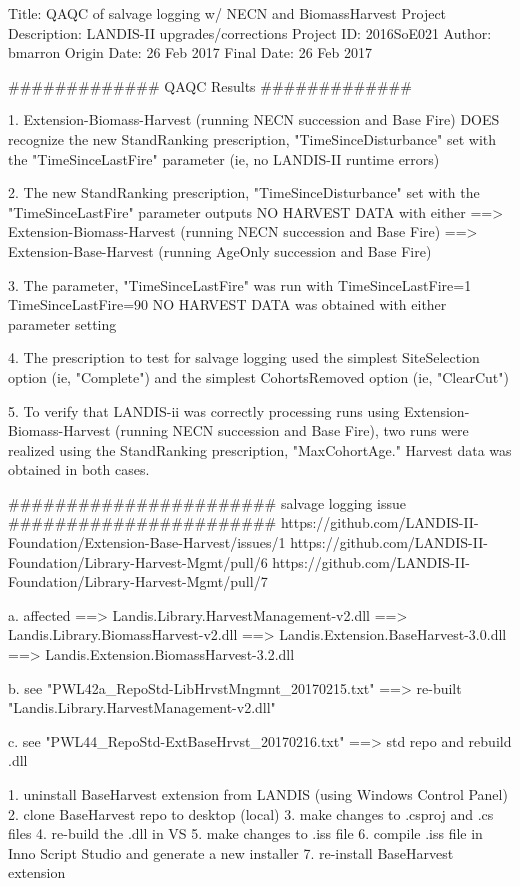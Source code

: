 Title:				QAQC of salvage logging w/ NECN and BiomassHarvest
Project Description:		LANDIS-II upgrades/corrections
Project ID:			2016SoE021
Author:				bmarron
Origin Date:			26 Feb 2017
Final Date:			26 Feb 2017


#############
QAQC Results
#############

	1. Extension-Biomass-Harvest (running NECN succession and Base Fire) DOES recognize 
	    the new StandRanking prescription, "TimeSinceDisturbance" set with the 
	    "TimeSinceLastFire" parameter (ie, no LANDIS-II runtime errors)

	2. The new StandRanking prescription, "TimeSinceDisturbance" set with the 
	   "TimeSinceLastFire" parameter outputs NO HARVEST DATA with either
		==> Extension-Biomass-Harvest (running NECN succession and Base Fire) 
	    	==> Extension-Base-Harvest (running AgeOnly succession and Base Fire)

	3. The parameter, "TimeSinceLastFire" was run with 
		TimeSinceLastFire=1
		TimeSinceLastFire=90
	   NO HARVEST DATA was obtained with either parameter setting

	4. The prescription to test for salvage logging used the simplest SiteSelection
	   option (ie, "Complete") and the simplest CohortsRemoved option (ie, "ClearCut")

	5. To verify that LANDIS-ii was correctly processing runs using
	   Extension-Biomass-Harvest (running NECN succession and Base Fire), two runs were
	   realized using the StandRanking prescription, "MaxCohortAge." Harvest data was 
	   obtained in both cases.



#######################
salvage logging issue
#######################
https://github.com/LANDIS-II-Foundation/Extension-Base-Harvest/issues/1
https://github.com/LANDIS-II-Foundation/Library-Harvest-Mgmt/pull/6
https://github.com/LANDIS-II-Foundation/Library-Harvest-Mgmt/pull/7

	a. affected
		==> Landis.Library.HarvestManagement-v2.dll
		==> Landis.Library.BiomassHarvest-v2.dll
		==> Landis.Extension.BaseHarvest-3.0.dll
		==> Landis.Extension.BiomassHarvest-3.2.dll


	b. see "PWL42a_RepoStd-LibHrvstMngmnt_20170215.txt"
		==> re-built "Landis.Library.HarvestManagement-v2.dll"


	c. see "PWL44_RepoStd-ExtBaseHrvst_20170216.txt"
		==> std repo and rebuild .dll

1. uninstall BaseHarvest extension from LANDIS (using Windows Control Panel)
2. clone BaseHarvest repo to desktop (local)
3. make changes to .csproj and .cs files
4. re-build the .dll in VS 
5. make changes to .iss file 
6. compile .iss file in Inno Script Studio and generate a new installer
7. re-install BaseHarvest extension



